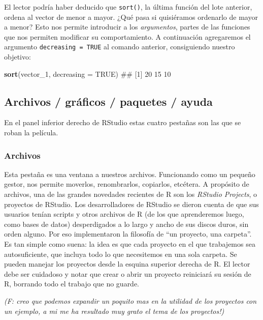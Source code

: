 \documentclass[]{book}
\newenvironment{Shaded}{\begin{snugshade}}{\end{snugshade}}
\newcommand{\KeywordTok}[1]{\textcolor[rgb]{0.13,0.29,0.53}{\textbf{#1}}}
\newcommand{\DataTypeTok}[1]{\textcolor[rgb]{0.13,0.29,0.53}{#1}}
\newcommand{\DecValTok}[1]{\textcolor[rgb]{0.00,0.00,0.81}{#1}}
\newcommand{\OtherTok}[1]{\textcolor[rgb]{0.56,0.35,0.01}{#1}}
\newcommand{\NormalTok}[1]{#1}
\begin{document}
El lector podría haber deducido que \texttt{sort()}, la última función
del lote anterior, ordena al vector de menor a mayor. ¿Qué pasa si
quisiéramos ordenarlo de mayor a menor? Esto nos permite introducir a
los \emph{argumentos}, partes de las funciones que nos permiten
modificar su comportamiento. A continuación agregaremos el argumento
\texttt{decreasing\ =\ TRUE} al comando anterior, consiguiendo nuestro
objetivo:

\begin{Shaded}
\begin{Highlighting}[]
\KeywordTok{sort}\NormalTok{(vector_}\DecValTok{1}\NormalTok{, }\DataTypeTok{decreasing =} \OtherTok{TRUE}\NormalTok{)}
\NormalTok{## [1] 20 15 10}
\end{Highlighting}
\end{Shaded}

\subsection{Archivos / gráficos / paquetes /
ayuda}\label{archivos-graficos-paquetes-ayuda}

En el panel inferior derecho de RStudio estas cuatro pestañas son las
que se roban la película.

\subsubsection{Archivos}\label{archivos}

Esta pestaña es una ventana a nuestros archivos. Funcionando como un
pequeño gestor, nos permite moverlos, renombrarlos, copiarlos, etcétera.
A propósito de archivos, una de las grandes novedades recientes de R son
los \emph{RStudio Projects}, o proyectos de RStudio. Los desarrolladores
de RStudio se dieron cuenta de que sus usuarios tenían scripts y otros
archivos de R (de los que aprenderemos luego, como bases de datos)
desperdigados a lo largo y ancho de sus discos duros, sin orden alguno.
Por eso implementaron la filosofía de ``un proyecto, una carpeta''. Es
tan simple como suena: la idea es que cada proyecto en el que trabajemos
sea autosuficiente, que incluya todo lo que necesitemos en una sola
carpeta. Se pueden manejar los proyectos desde la esquina superior
derecha de R. El lector debe ser cuidadoso y notar que crear o abrir un
proyecto reiniciará su sesión de R, borrando todo el trabajo que no
guarde.

\emph{(F: creo que podemos expandir un poquito mas en la utilidad de los
proyectos con un ejemplo, a mi me ha resultado muy grato el tema de los
proyectos!)}
\end{document}
